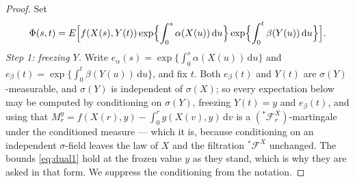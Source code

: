 \documentclass[11pt,a4paper]{article}
\theoremstyle{plain}
\theoremstyle{definition}
\theoremstyle{remark}
\newcommand{\Filt}{\mathcal{F}}
\newcommand{\dif}{\,\mathrm{d}}
\begin{document}
\begin{proof}
  Set
  \begin{equation}
    \label{eq:Phidual}
    \Phi(s,t) = E\Bigl[ f(X(s),Y(t))
      \exp\Bigl\{ \int_0^s \alpha(X(u)) \dif u \Bigr\}
      \exp\Bigl\{ \int_0^t \beta(Y(u)) \dif u \Bigr\} \Bigr] .
  \end{equation}
  \emph{Step 1: freezing $Y$.}
  Write $e_\alpha(s) = \exp\{\int_0^s \alpha(X(u))\dif u\}$ and
  $e_\beta(t) = \exp\{\int_0^t \beta(Y(u))\dif u\}$, and fix $t$.  Both $e_\beta(t)$
  and $Y(t)$ are $\sigma(Y)$-measurable, and $\sigma(Y)$ is independent of
  $\sigma(X)$; so every expectation below may be computed by conditioning on
  $\sigma(Y)$, freezing $Y(t) = y$ and $e_\beta(t)$, and using that
  $M^y_r = f(X(r),y) - \int_0^r g(X(v),y)\dif v$ is a
  $({}^{*}\Filt^X_r)$-martingale under the conditioned measure --- which it is,
  because conditioning on an independent $\sigma$-field leaves the law of $X$ and
  the filtration ${}^{*}\Filt^X$ unchanged.  The bounds \eqref{eq:dual1} hold at
  the frozen value $y$ as they stand, which is why they are asked in that form.
  We suppress the conditioning from the notation.


\end{proof}
\end{document}
